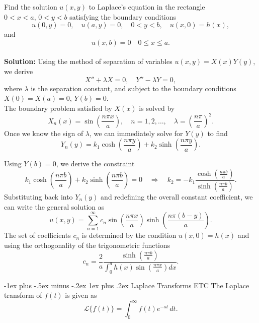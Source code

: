 \documentclass[10pt,landscape]{article}
\makeatletter
\renewcommand{\subsubsection}{\@startsection{subsubsection}{3}{0mm}%
                                {-1ex plus -.5ex minus -.2ex}%
                                {1ex plus .2ex}%
                                {\normalfont\small\bfseries}}
\makeatother
\begin{document}
\begin{multicols}{2}
Find the solution \(u(x, y)\) to Laplace’s equation in the rectangle \(0 < x < a, \, 0 < y < b\) satisfying the boundary conditions\\

\[
u(0, y) = 0, \quad u(a, y) = 0, \quad 0 < y < b,\quad
u(x, 0) = h(x),\] and\[ u(x, b) = 0 \quad 0 \le x \le a.
\]\\
\bigskip
\textbf{Solution:} Using the method of separation of variables \(u(x, y) = X(x)Y(y)\), we derive \\ 
\[
X'' + \lambda X = 0, \quad Y'' - \lambda Y = 0,
\]
where \(\lambda\) is the separation constant, and subject to the boundary conditions \(X(0) = X(a) = 0\), \(Y(b) = 0\).\\

The boundary problem satisfied by \(X(x)\) is solved by  \\
\[
X_n(x) = \sin\left(\frac{n\pi x}{a}\right), \quad n = 1, 2, \dots, \quad \lambda = \left(\frac{n\pi}{a}\right)^2.
\]
Once we know the sign of \(\lambda\), we can immediately solve for \(Y(y)\) to find \\ 
\[
Y_n(y) = k_1 \cosh\left(\frac{n\pi y}{a}\right) + k_2 \sinh\left(\frac{n\pi y}{a}\right).
\]

Using \(Y(b) = 0\), we derive the constraint\\
\[
k_1 \cosh\left(\frac{n\pi b}{a}\right) + k_2 \sinh\left(\frac{n\pi b}{a}\right) = 0 \quad \Rightarrow \quad k_2 = -k_1 \frac{\cosh\left(\frac{n\pi b}{a}\right)}{\sinh\left(\frac{n\pi b}{a}\right)}.
\]
Substituting back into \(Y_n(y)\) and redefining the overall constant coefficient, we can write the general solution as\\
\[
u(x, y) = \sum_{n=1}^{\infty} c_n \sin\left(\frac{n\pi x}{a}\right) \sinh\left(\frac{n\pi(b - y)}{a}\right).
\]
The set of coefficients \(c_n\) is determined by the condition \(u(x, 0) = h(x)\) and using the orthogonality of the trigonometric functions\\
\[
c_n = \displaystyle \frac{2}{a} \frac{\sinh\left(\frac{n\pi b}{a}\right)}{\displaystyle \int_0^a h(x) \sin\left(\frac{n\pi x}{a}\right) dx}.
\]

\subsubsection{Laplace Transforms ETC}
The Laplace transform of \( f(t) \) is given as\\
\[
\mathcal{L} \{ f(t) \} = \int_0^\infty f(t) e^{-st} \, dt.
\]
\begin{enumerate}
 


\end{enumerate}
\end{multicols}
\end{document}
